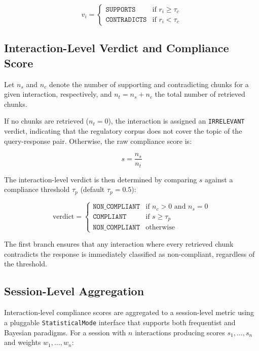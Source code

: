 \documentclass[11pt]{article}
\begin{document}
\begin{equation}
    v_i = \begin{cases}
        \texttt{SUPPORTS}     & \text{if } r_i \geq \tau_c \\
        \texttt{CONTRADICTS}  & \text{if } r_i < \tau_c
    \end{cases}
\end{equation}

\subsection{Interaction-Level Verdict and Compliance Score}

Let $n_s$ and $n_c$ denote the number of supporting and contradicting chunks for a given interaction, respectively, and $n_t = n_s + n_c$ the total number of retrieved chunks.

If no chunks are retrieved ($n_t = 0$), the interaction is assigned an \texttt{IRRELEVANT} verdict, indicating that the regulatory corpus does not cover the topic of the query-response pair. Otherwise, the raw compliance score is:

\begin{equation}
    s = \frac{n_s}{n_t}
\end{equation}

The interaction-level verdict is then determined by comparing $s$ against a compliance threshold $\tau_p$ (default $\tau_p = 0.5$):

\begin{equation}
    \text{verdict} = \begin{cases}
        \texttt{NON\_COMPLIANT} & \text{if } n_c > 0 \text{ and } n_s = 0 \\
        \texttt{COMPLIANT}      & \text{if } s \geq \tau_p \\
        \texttt{NON\_COMPLIANT} & \text{otherwise}
    \end{cases}
\end{equation}

The first branch ensures that any interaction where every retrieved chunk contradicts the response is immediately classified as non-compliant, regardless of the threshold.

\subsection{Session-Level Aggregation}

Interaction-level compliance scores are aggregated to a session-level metric using a pluggable \texttt{StatisticalMode} interface that supports both frequentist and Bayesian paradigms. For a session with $n$ interactions producing scores $s_1, \ldots, s_n$ and weights $w_1, \ldots, w_n$:
\end{document}
